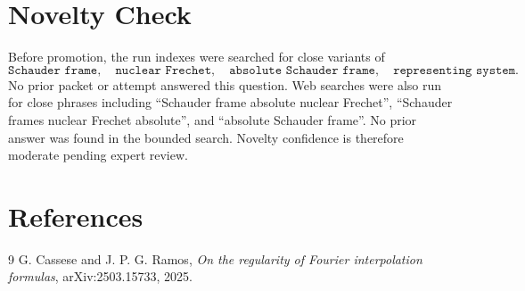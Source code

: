 \documentclass[11pt]{article}
\begin{document}
\section*{Novelty Check}

Before promotion, the run indexes were searched for close variants of
\[
\texttt{Schauder frame},\quad \texttt{nuclear Frechet},\quad
\texttt{absolute Schauder frame},\quad \texttt{representing system}.
\]
No prior packet or attempt answered this question. Web searches were also run for close phrases including ``Schauder frame absolute nuclear Frechet'', ``Schauder frames nuclear Frechet absolute'', and ``absolute Schauder frame''. No prior answer was found in the bounded search. Novelty confidence is therefore moderate pending expert review.

\section*{References}

\begin{thebibliography}{9}
G. Cassese and J. P. G. Ramos,
\emph{On the regularity of Fourier interpolation formulas},
arXiv:2503.15733, 2025.
\end{thebibliography}
\end{document}
